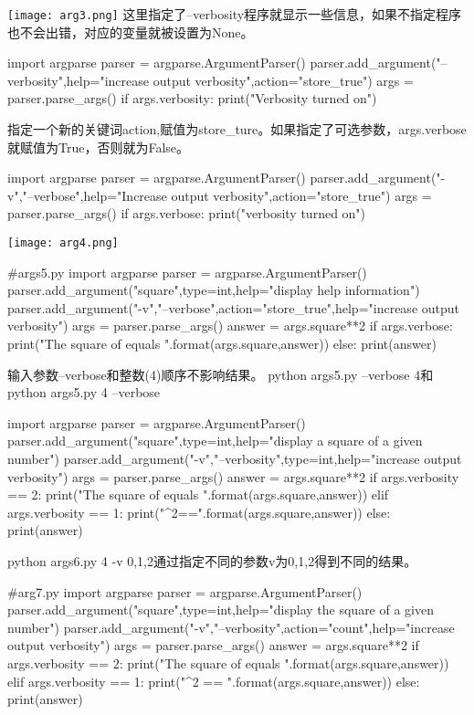 \texttt{[image: arg3.png]}\newline
这里指定了--verbosity程序就显示一些信息，如果不指定程序也不会出错，对应的变量就被设置为None。
\begin{python}
import argparse
parser = argparse.ArgumentParser()
parser.add_argument("--verbosity",help="increase output verbosity",action="store_true")
args = parser.parse_args()
if args.verbosity:
    print("Verbosity turned on")
\end{python}
指定一个新的关键词action,赋值为store\_ture。如果指定了可选参数，args.verbose就赋值为True，否则就为False。
\begin{python}
import argparse
parser = argparse.ArgumentParser()
parser.add_argument("-v","--verbose",help="Increase output verbosity",action="store_true")
args = parser.parse_args()
if args.verbose:
    print("verbosity turned on")
\end{python}
\texttt{[image: arg4.png]}\newline
\begin{python}
#args5.py
import argparse
parser = argparse.ArgumentParser()
parser.add_argument("square",type=int,help="display help information")
parser.add_argument("-v","--verbose",action="store_true",help="increase output verbosity")
args = parser.parse_args()
answer = args.square**2
if args.verbose:
    print("The square of {} equals {}".format(args.square,answer))
else:
    print(answer)
\end{python}
输入参数--verbose和整数(4)顺序不影响结果。
python args5.py --verbose 4和python args5.py 4 --verbose
\begin{python}
import argparse
parser = argparse.ArgumentParser()
parser.add_argument("square",type=int,help="display a square of a given number")
parser.add_argument("-v","--verbosity",type=int,help="increase output verbosity")
args = parser.parse_args()
answer = args.square**2
if args.verbosity == 2:
    print("The square of {} equals {}".format(args.square,answer))
elif args.verbosity == 1:
    print("{}^2=={}".format(args.square,answer))
else:
    print(answer)
\end{python}
python args6.py 4 -v 0,1,2通过指定不同的参数v为0,1,2得到不同的结果。
\begin{python}
#arg7.py
import argparse
parser = argparse.ArgumentParser()
parser.add_argument("square",type=int,help="display the square of a given number")
parser.add_argument("-v","--verbosity",action="count",help="increase output verbosity")
args = parser.parse_args()
answer = args.square**2
if args.verbosity == 2:
    print("The square of {} equals {}".format(args.square,answer))
elif args.verbosity == 1:
    print("{}^2 == {}".format(args.square,answer))
else:
    print(answer)
\end{python}
